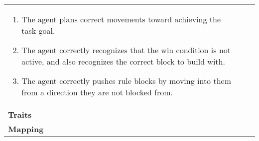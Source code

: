 \documentclass{article}
\begin{document}
\begin{table}[!t]
\begin{tabular}{p{1.5cm}p{4cm}p{4cm}}
        \begin{enumerate}[left=0pt]
          \item The agent plans correct movements toward achieving the task goal.
          \item The agent correctly recognizes that the win condition is not active, and also recognizes the correct block to build with.
          \item The agent correctly pushes rule blocks by moving into them from a direction they are not blocked from.
        \end{enumerate} & \\
        \textbf{Traits}     & & \\
        \textbf{Mapping}    & & \\
        \bottomrule
    \end{tabular}
    \caption{
    }
    \label{tab:babaisai-cogym}
\end{table}
\end{document}
